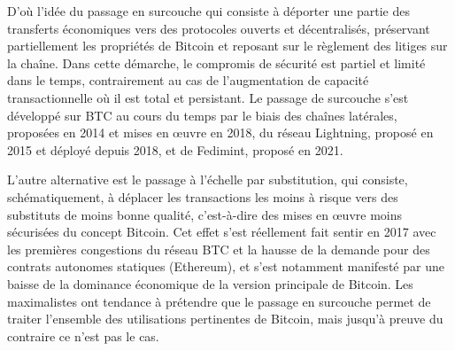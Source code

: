 D'où l'idée du passage en surcouche qui consiste à déporter une partie des transferts économiques vers des protocoles ouverts et décentralisés, préservant partiellement les propriétés de Bitcoin et reposant sur le règlement des litiges sur la chaîne. Dans cette démarche, le compromis de sécurité est partiel et limité dans le temps, contrairement au cas de l'augmentation de capacité transactionnelle où il est total et persistant. Le passage de surcouche s'est développé sur BTC au cours du temps par le biais des chaînes latérales, proposées en 2014 et mises en œuvre en 2018, du réseau Lightning, proposé en 2015 et déployé depuis 2018, et de Fedimint, proposé en 2021.

L'autre alternative est le passage à l'échelle par substitution, qui consiste, schématiquement, à déplacer les transactions les moins à risque vers des substituts de moins bonne qualité, c'est-à-dire des mises en œuvre moins sécurisées du concept Bitcoin. Cet effet s'est réellement fait sentir en 2017 avec les premières congestions du réseau BTC et la hausse de la demande pour des contrats autonomes statiques (Ethereum), et s'est notamment manifesté par une baisse de la dominance économique de la version principale de Bitcoin. Les maximalistes ont tendance à prétendre que le passage en surcouche permet de traiter l'ensemble des utilisations pertinentes de Bitcoin, mais jusqu'à preuve du contraire ce n'est pas le cas.
